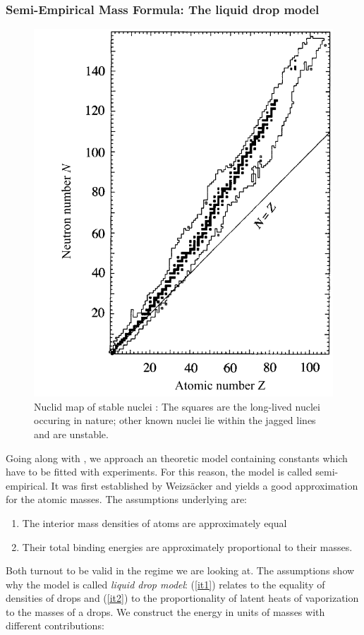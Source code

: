 \subsubsection{Semi-Empirical Mass Formula: The liquid drop model}
\begin{figure}[htpb]
    \centering
    \includegraphics[width=0.6\linewidth]{figures/nuclidmap}
    \caption{Nuclid map of stable nuclei \cite{Hooshyar}: The squares are the long-lived nuclei
    occuring in nature; other known nuclei lie within the jagged lines and are unstable.}
    \label{fig:nuclidmap}
\end{figure}
\label{ssub:Semi-Empirical Mass Formula: The Liquid Drop Model}
Going along with  \cite{Hooshyar}, we approach an theoretic model containing constants which
have to be fitted with experiments. For this reason, the model is called semi-empirical. 
It was first established by Weizsäcker and yields a 
good approximation for the atomic masses. The assumptions underlying are:
\begin{enumerate}
    \item The interior mass densities of atoms are approximately equal
        \label{it1}
    \item Their total binding energies are approximately proportional to their masses.
        \label{it2}
\end{enumerate}
Both turnout to be valid in the regime we are looking at.
The assumptions show why the model is called \emph{liquid drop model}: (\ref{it1}) relates to the equality of densities
of drops and (\ref{it2}) to the proportionality of latent heats of vaporization to the masses of a drops. 
We construct the energy in units of masses with different contributions:

